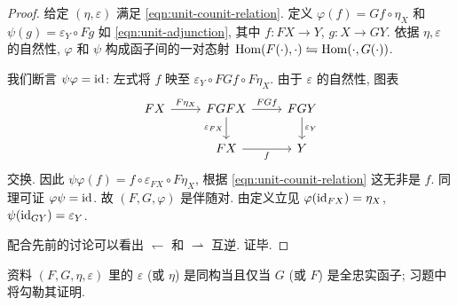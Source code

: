 \begin{proof}
	给定 $(\eta, \varepsilon)$ 满足 \eqref{eqn:unit-counit-relation}. 定义 $\varphi(f) = Gf \circ \eta_X$ 和 $\psi(g) = \varepsilon_Y \circ Fg$ 如 \eqref{eqn:unit-adjunction}, 其中 $f: FX \to Y$, $g: X \to GY$. 依据 $\eta, \varepsilon$ 的自然性, $\varphi$ 和 $\psi$ 构成函子间的一对态射 $\operatorname{Hom}(F(\cdot), \cdot) \leftrightharpoons \operatorname{Hom}(\cdot, G(\cdot))$.

	我们断言 $\psi \varphi = \mathrm{id}$: 左式将 $f$ 映至 $\varepsilon_Y \circ FGf \circ F\eta_X$. 由于 $\varepsilon$ 的自然性, 图表
	\[\begin{tikzcd}
		FX \arrow[r, "{F\eta_X}"] & FGFX \arrow[r, "{FGf}"] \arrow[d, "{\varepsilon_{FX}}"'] & FGY \arrow[d, "{\varepsilon_Y}"] \\
		& FX \arrow[r, "f"'] & Y
	\end{tikzcd} \]
	交换. 因此 $\psi \varphi(f) = f \circ \varepsilon_{FX} \circ F\eta_X$, 根据 \eqref{eqn:unit-counit-relation} 这无非是 $f$. 同理可证 $\varphi \psi =\mathrm{id}$. 故 $(F, G, \varphi)$ 是伴随对. 由定义立见 $\varphi(\mathrm{id}_{FX})=\eta_X$, $\psi(\mathrm{id}_{GY}) = \varepsilon_Y$.

	配合先前的讨论可以看出 $\leftharpoondown$ 和 $\rightharpoonup$ 互逆. 证毕.
\end{proof}
资料 $(F, G, \eta, \varepsilon)$ 里的 $\varepsilon$ (或 $\eta$) 是同构当且仅当 $G$ (或 $F$) 是全忠实函子; 习题中将勾勒其证明.

